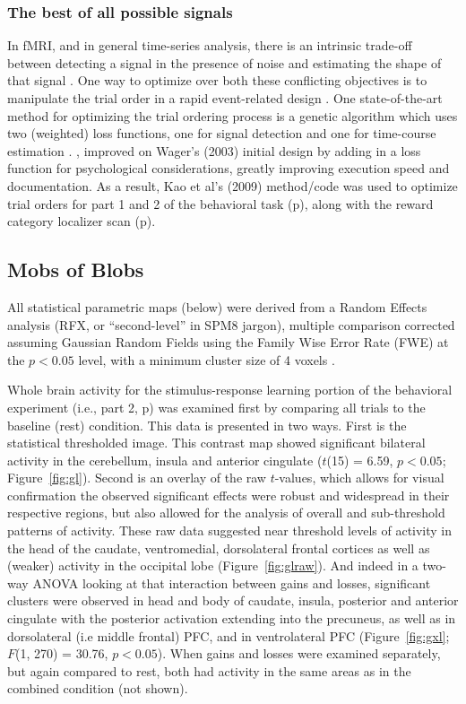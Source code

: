 \subsubsection{The best of all possible signals}
\label{subsub:bestsignal}
In fMRI, and in general time-series analysis, there is an intrinsic trade-off between detecting a signal in the presence of noise and estimating the shape of that signal \cite{Dale:1999p7901,Birn:2002p1777,Liu:2004p2141}.   One way to optimize over both these conflicting objectives is to manipulate the trial order in a rapid event-related design \cite{Miezin:2000p7924}.  One state-of-the-art method for optimizing the trial ordering process is a genetic algorithm which uses two (weighted) loss functions, one for signal detection and one for time-course estimation \cite{Wager:2003p2980}. , improved on Wager's (2003) initial design by adding in a loss function for psychological considerations, greatly improving execution speed and documentation.  As a result, Kao et al's (2009) method/code was used to optimize trial orders for part 1 and 2 of the behavioral task (p\pageref{subsub:whatwhen}), along with the reward category localizer scan (p\pageref{subsub:datadetails}).

\subsection{Mobs of Blobs}
\label{sub:blob}
All statistical parametric maps (below) were derived from a Random Effects analysis (RFX, or ``second-level'' in SPM8 jargon), multiple comparison corrected assuming Gaussian Random Fields using the Family Wise Error Rate (FWE) at the $p < 0.05$ level, with a minimum cluster size of 4 voxels \cite{Worsley:1996p9367}. 

Whole brain activity for the stimulus-response learning portion of the behavioral experiment (i.e., part 2, p\pageref{subsub:whatwhen}) was examined first by comparing all trials to the baseline (rest) condition.  This data is presented in two ways. First is the statistical thresholded image.  This contrast map showed significant bilateral activity in the cerebellum, insula and anterior cingulate ($t$(15) = 6.59, $p< 0.05$; Figure~\ref{fig:gl}).  Second is an overlay of the raw $t$-values, which allows for visual confirmation the observed significant effects were robust and widespread in their respective regions, but also allowed for the analysis of overall and sub-threshold patterns of activity.  These raw data suggested near threshold levels of activity in the head of the caudate, ventromedial, dorsolateral frontal cortices as well as (weaker) activity in the occipital lobe (Figure~\ref{fig:glraw}).  And indeed in a two-way ANOVA looking at that interaction between gains and losses, significant clusters were observed in head and body of caudate, insula, posterior and anterior cingulate with the posterior activation extending into the precuneus, as well as in dorsolateral (i.e middle frontal) PFC, and in ventrolateral PFC (Figure~\ref{fig:gxl}; $F$(1, 270) = 30.76, $p < 0.05$).  When gains and losses were examined separately, but again compared to rest, both had activity in the same areas as in the combined condition (not shown).

